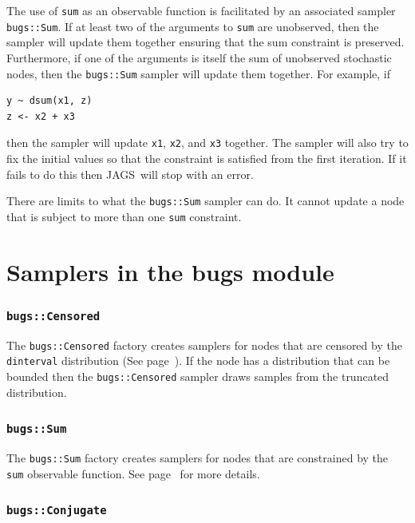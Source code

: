 \documentclass[11pt, a4paper, titlepage]{report}
\newcommand{\JAGS}{\textsf{JAGS}}
\begin{document}
The use of \texttt{sum} as an observable function is facilitated by an
associated sampler \texttt{bugs::Sum}. If at least two of the
arguments to \texttt{sum} are unobserved, then the sampler will update
them together ensuring that the sum constraint is preserved.
Furthermore, if one of the arguments is itself the sum of unobserved
stochastic nodes, then the \texttt{bugs::Sum} sampler will update them
together. For example, if
\begin{verbatim}
y ~ dsum(x1, z)
z <- x2 + x3
\end{verbatim}
then the sampler will update {\tt x1}, {\tt x2}, and {\tt x3}
together. The sampler will also try to fix the initial values so that
the constraint is satisfied from the first iteration. If it fails to
do this then \JAGS\ will stop with an error.

There are limits to what the \texttt{bugs::Sum} sampler can do. It
cannot update a node that is subject to more than one \texttt{sum}
constraint.

\section{Samplers in the bugs module}


\subsubsection{\texttt{bugs::Censored}}

The \texttt{bugs::Censored} factory creates samplers for nodes that
are censored by the \texttt{dinterval} distribution (See
page~\pageref{bugs:dinterval}). If the node has a distribution that can be
bounded then the \texttt{bugs::Censored} sampler draws samples from
the truncated distribution.

\subsubsection{\texttt{bugs::Sum}}

The \texttt{bugs::Sum} factory creates samplers for nodes that are
constrained by the \texttt{sum} observable function. See
page~\pageref{bugs:sum} for more details.

\subsubsection{\texttt{bugs::Conjugate}}
\end{document}
